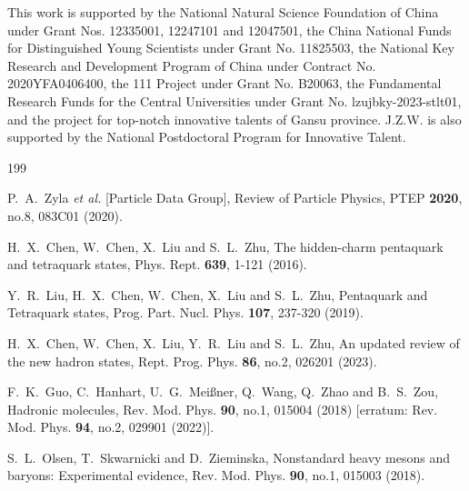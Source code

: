 \documentclass[final,5p,times,twocolumn]{elsarticle}
\begin{document}
This work is supported by the National Natural Science Foundation of China under Grant Nos. 12335001, 12247101 and 12047501, the China National Funds for Distinguished Young Scientists under Grant No. 11825503, the National Key Research and Development Program of China under Contract No. 2020YFA0406400, the 111 Project under Grant No. B20063, the Fundamental Research Funds for the Central Universities under Grant No. lzujbky-2023-stlt01, and the project for top-notch innovative talents of Gansu province. J.Z.W. is also supported by the National Postdoctoral Program for Innovative Talent.





\begin{thebibliography}{199}

P.~A.~Zyla \textit{et al.} [Particle Data Group],
Review of Particle Physics,
PTEP \textbf{2020}, no.8, 083C01 (2020).


H.~X.~Chen, W.~Chen, X.~Liu and S.~L.~Zhu,
The hidden-charm pentaquark and tetraquark states,
Phys. Rept. \textbf{639}, 1-121 (2016).

Y.~R.~Liu, H.~X.~Chen, W.~Chen, X.~Liu and S.~L.~Zhu,
Pentaquark and Tetraquark states,
Prog. Part. Nucl. Phys. \textbf{107}, 237-320 (2019).


H.~X.~Chen, W.~Chen, X.~Liu, Y.~R.~Liu and S.~L.~Zhu,
An updated review of the new hadron states,
Rept. Prog. Phys. \textbf{86}, no.2, 026201 (2023).

F.~K.~Guo, C.~Hanhart, U.~G.~Mei\ss{}ner, Q.~Wang, Q.~Zhao and B.~S.~Zou,
Hadronic molecules,
Rev. Mod. Phys. \textbf{90}, no.1, 015004 (2018)
[erratum: Rev. Mod. Phys. \textbf{94}, no.2, 029901 (2022)].


S.~L.~Olsen, T.~Skwarnicki and D.~Zieminska,
Nonstandard heavy mesons and baryons: Experimental evidence,
Rev. Mod. Phys. \textbf{90}, no.1, 015003 (2018).


\end{thebibliography}
\end{document}
